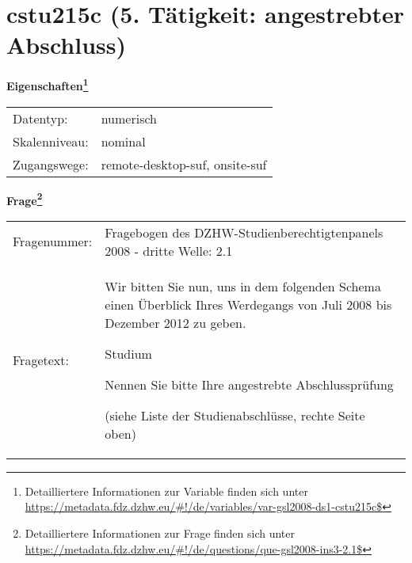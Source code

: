 
    \setcounter{footnote}{0}

    \vspace*{-1.8cm}
	\section{cstu215c (5. Tätigkeit: angestrebter Abschluss)}
	\label{section:cstu215c}



    \vspace*{0.5cm}
    \noindent\textbf{Eigenschaften\footnote{Detailliertere Informationen zur Variable finden sich unter
		\url{https://metadata.fdz.dzhw.eu/\#!/de/variables/var-gsl2008-ds1-cstu215c$}}}\\
	\begin{tabularx}{\hsize}{@{}lX}
	Datentyp: & numerisch \\
	Skalenniveau: & nominal \\
	Zugangswege: &
	  remote-desktop-suf, 
	  onsite-suf
 \\
    \end{tabularx}



				\vspace*{0.5cm}
                \noindent\textbf{Frage\footnote{Detailliertere Informationen zur Frage finden sich unter
		              \url{https://metadata.fdz.dzhw.eu/\#!/de/questions/que-gsl2008-ins3-2.1$}}}\\
				\begin{tabularx}{\hsize}{@{}lX}
					Fragenummer: &
					  Fragebogen des DZHW-Studienberechtigtenpanels 2008 - dritte Welle:
					  2.1
 \\
					Fragetext: & Wir bitten Sie nun, uns in dem folgenden Schema einen Überblick Ihres Werdegangs von Juli 2008 bis Dezember 2012 zu geben.\par  Studium\par  Nennen Sie bitte Ihre angestrebte Abschlussprüfung \par  (siehe Liste der Studienabschlüsse, rechte Seite oben) \\
				\end{tabularx}





